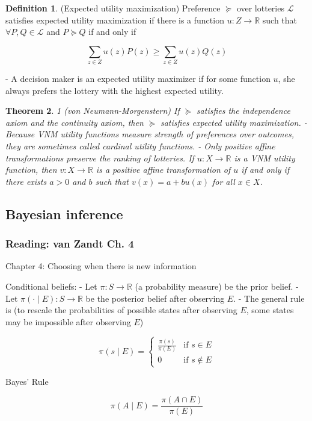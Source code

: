 \documentclass[12pt]{article}
\newtheorem{theorem}{Theorem}[section]
\theoremstyle{definition}
\newtheorem{definition}[theorem]{Definition}
\theoremstyle{remark}
\begin{document}
\begin{definition}(Expected utility maximization) Preference $\succeq$ over lotteries $\mathcal{L}$ satisfies expected utility maximization if there is a function $u \colon Z \to \mathbb{R}$ such that $\forall P, Q \in \mathcal{L}$ and $P \succeq Q$ if and only if

    \[
        \sum_{z \in Z} u(z) P(z) \geq \sum_{z \in Z} u(z) Q(z)
    \]

    - A decision maker is an expected utility maximizer if for some function $u$, she always prefers the lottery with the highest expected utility.

\end{definition}

\begin{theorem}1 (von Neumann-Morgenstern) If $\succeq$ satisfies the independence axiom and the continuity axiom, then $\succeq$ satisfies expected utility maximization.
    - Because VNM utility functions measure strength of preferences over outcomes, they are sometimes called cardinal utility functions.
    - Only positive affine transformations preserve the ranking of lotteries. If $u \colon X \to \mathbb{R}$ is a VNM utility function, then $v \colon X \to \mathbb{R}$ is a positive affine transformation of $u$ if and only if there exists $a > 0$ and $b$ such that $v(x) = a + b u(x)$ for all $x \in X$.

\end{theorem}

\subsection{Bayesian inference}

\subsubsection{Reading: van Zandt Ch. 4}

Chapter 4: Choosing when there is new information

Conditional beliefs:
- Let $\pi \colon S \to \mathbb{R}$ (a probability measure) be the prior belief.
- Let $\pi(\cdot \mid E) \colon S \to \mathbb{R}$ be the posterior belief after observing $E$.
- The general rule is (to rescale the probabilities of possible states after observing $E$, some states may be impossible after observing $E$)

\[
    \pi(s \mid E) = \begin{cases}
        \frac{\pi(s)}{\pi(E)} & \text{if } s \in E \\
        0 & \text{if } s \notin E
    \end{cases}
\]

Bayes' Rule

\[
    \pi(A \mid E) = \frac{\pi(A \cap E)}{\pi(E)}
\]
\end{document}
